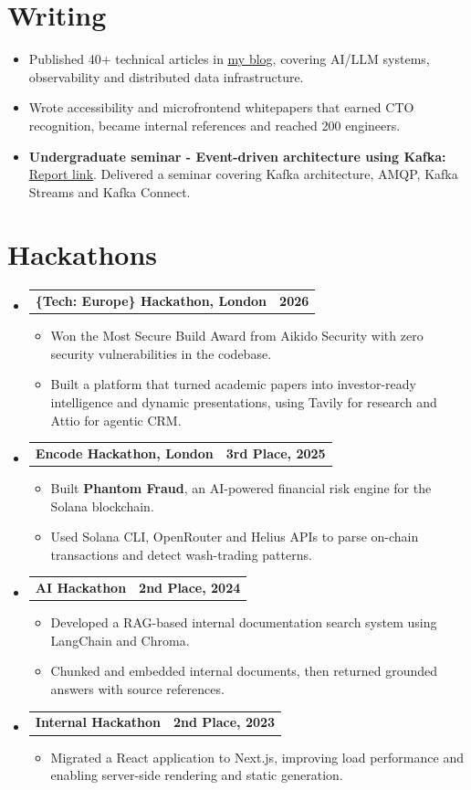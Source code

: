 \documentclass[a4paper,10pt]{article}
\makeatletter
\newcommand{\cvLink}[2]{\href{#1}{\underline{#2}}}
\newcommand{\resumeItem}[1]{\item\small #1}
\newcommand{\resumeProjectHeading}[2]{
  \item[]
  \begin{tabular*}{\textwidth}{l@{\extracolsep{\fill}}r}
    \textbf{#1} & \textbf{\small #2}
  \end{tabular*}\vspace{-4pt}
}
\newcommand{\resumeSubHeadingListStart}{\begin{itemize}[leftmargin=0pt,label={},itemsep=1pt,topsep=1pt]}
\newcommand{\resumeSubHeadingListEnd}{\end{itemize}}
\newcommand{\resumeItemListStart}{\begin{itemize}[leftmargin=14pt,itemsep=1.4pt,topsep=2pt,parsep=0pt]}
\newcommand{\resumeItemListEnd}{\end{itemize}\vspace{1pt}}
\makeatother
\begin{document}
\section{Writing}
\begin{itemize}[leftmargin=14pt,itemsep=1.4pt,topsep=1pt]
  \small
  \item Published 40+ technical articles in \cvLink{https://aymanace2049.hashnode.dev}{my blog}, covering AI/LLM systems, observability and distributed data infrastructure.
  \item Wrote accessibility and microfrontend whitepapers that earned CTO recognition, became internal references and reached 200 engineers.
  \item \textbf{Undergraduate seminar - Event-driven architecture using Kafka:} \cvLink{https://drive.google.com/file/d/1txqBQZaRxxT7wu5csBuIHUfi8DrRvUMU/view?usp=sharing}{Report link}. Delivered a seminar covering Kafka architecture, AMQP, Kafka Streams and Kafka Connect.
\end{itemize}

\section{Hackathons}
\resumeSubHeadingListStart
  \resumeProjectHeading{\{Tech: Europe\} Hackathon, London}{2026}
  \resumeItemListStart
    \resumeItem{Won the Most Secure Build Award from Aikido Security with zero security vulnerabilities in the codebase.}
    \resumeItem{Built a platform that turned academic papers into investor-ready intelligence and dynamic presentations, using Tavily for research and Attio for agentic CRM.}
  \resumeItemListEnd

  \resumeProjectHeading{Encode Hackathon, London}{3rd Place, 2025}
  \resumeItemListStart
    \resumeItem{Built \textbf{Phantom Fraud}, an AI-powered financial risk engine for the Solana blockchain.}
    \resumeItem{Used Solana CLI, OpenRouter and Helius APIs to parse on-chain transactions and detect wash-trading patterns.}
  \resumeItemListEnd

  \resumeProjectHeading{AI Hackathon}{2nd Place, 2024}
  \resumeItemListStart
    \resumeItem{Developed a RAG-based internal documentation search system using LangChain and Chroma.}
    \resumeItem{Chunked and embedded internal documents, then returned grounded answers with source references.}
  \resumeItemListEnd

  \resumeProjectHeading{Internal Hackathon}{2nd Place, 2023}
  \resumeItemListStart
    \resumeItem{Migrated a React application to Next.js, improving load performance and enabling server-side rendering and static generation.}
  \resumeItemListEnd
\resumeSubHeadingListEnd
\end{document}
